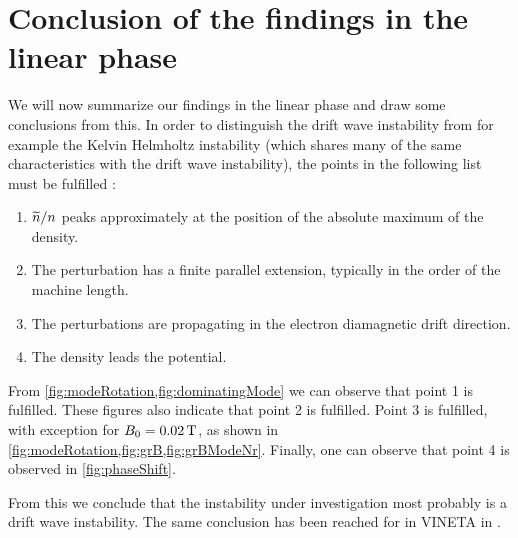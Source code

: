 \section{Conclusion of the findings in the linear phase}
%
We will now summarize our findings in the linear phase and draw some conclusions from this.
In order to distinguish the drift wave instability from for example the Kelvin Helmholtz instability (which shares many of the same characteristics with the drift wave instability), the points in the following list must be fulfilled \cite{Jassby1972,Hendel1968}:
%
\begin{enumerate}[noitemsep]
    \item $\widetilde{ n}/n$ peaks approximately at the position of the absolute maximum of the density.
    \item The perturbation has a finite parallel extension, typically in the order of the machine length.
    \item The perturbations are propagating in the electron diamagnetic drift direction.
    \item The density leads the potential.
\end{enumerate}
%
From \cref{fig:modeRotation,fig:dominatingMode} we can observe that point 1 is fulfilled.
These figures also indicate that point 2 is fulfilled.
Point 3 is fulfilled, with exception for $B_0=0.02\, \text{T}$, as shown in \cref{fig:modeRotation,fig:grB,fig:grBModeNr}.
Finally, one can observe that point 4 is observed in \cref{fig:phaseShift}.

From this we conclude that the instability under investigation most probably is a drift wave instability.
The same conclusion has been reached for in VINETA in \cite{Schroder2005}.
